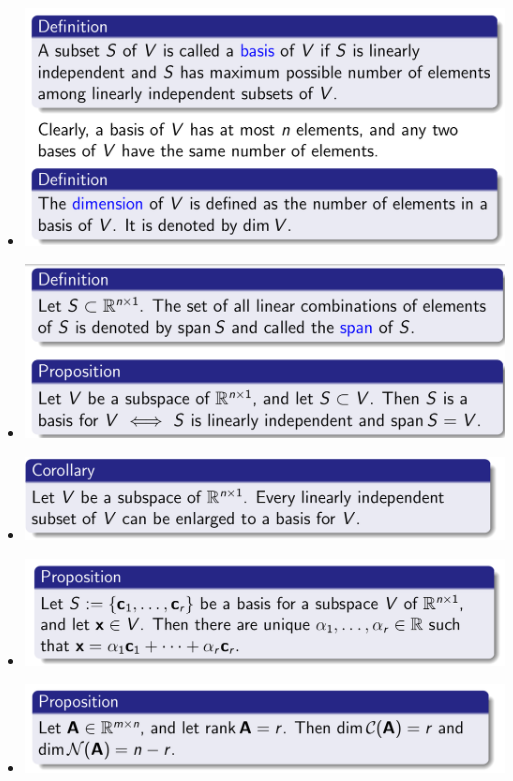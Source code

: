 \documentclass{article}
\begin{document}
\begin{itemize}
  \item \includegraphics[scale = 0.4]{27.png}
  \item \includegraphics[scale = 0.4]{28.png}
  \item \includegraphics[scale = 0.4]{29.png}
  \item \includegraphics[scale = 0.4]{30.png}
  \item \includegraphics[scale = 0.4]{31.png}

\end{itemize}
\end{document}
